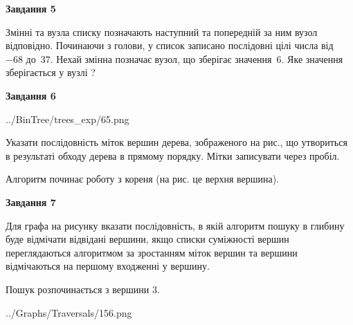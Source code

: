 \documentclass[12pt, ukrainian]{article}
\begin{document}
{\begin {large}
{\begin {center}\textbf{Завдання 5}\end {center}}\par
Змінні  та  вузла списку позначають наступний та попередній за ним вузол відповідно. Починаючи з голови, у список записано послідовні цілі числа від~$-68$ до~$37$. Нехай змінна  позначає вузол, що зберігає значення~$6$.
Яке значення зберігається у вузлі  ?\par
\newpage

{\begin {center}\textbf{Завдання 6}\end {center}}\par

\begin{center}
	{../BinTree/trees_exp/65.png}
\end{center}
Указати послідовність міток вершин дерева, зображеного на рис., що утвориться в результаті обходу дерева в прямому порядку. Мітки записувати через пробіл.\par Алгоритм починає роботу з кореня (на рис. це верхня вершина).\par
\newpage

{\begin {center}\textbf{Завдання 7}\end {center}}\par
Для графа на рисунку вказати послідовність, в якій алгоритм пошуку в глибину буде відмічати відвідані вершини, якщо списки суміжності вершин переглядаються алгоритмом за зростанням міток вершин та вершини відмічаються на першому вход\-женні у вершину.\par
Пошук розпочинається з вершини 3.\par

\begin{center}
	{../Graphs/Traversals/156.png}
\end{center}\par
\newpage


\end{large}}
\end{document}
